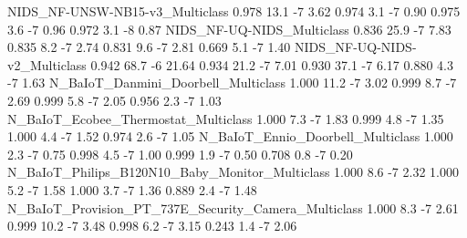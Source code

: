 NIDS_NF-UNSW-NB15-v3_Multiclass                                       0.978               13.1           -7            3.62      0.974                   3.1              -7               0.90      0.975                   3.6              -7               0.96       0.972                    3.1               -8                0.87
NIDS_NF-UQ-NIDS_Multiclass                                            0.836               25.9           -7            7.83      0.835                   8.2              -7               2.74      0.831                   9.6              -7               2.81       0.669                    5.1               -7                1.40
NIDS_NF-UQ-NIDS-v2_Multiclass                                         0.942               68.7           -6           21.64      0.934                  21.2              -7               7.01      0.930                  37.1              -7               6.17       0.880                    4.3               -7                1.63
N_BaIoT_Danmini_Doorbell_Multiclass                                   1.000               11.2           -7            3.02      0.999                   8.7              -7               2.69      0.999                   5.8              -7               2.05       0.956                    2.3               -7                1.03
N_BaIoT_Ecobee_Thermostat_Multiclass                                  1.000                7.3           -7            1.83      0.999                   4.8              -7               1.35      1.000                   4.4              -7               1.52       0.974                    2.6               -7                1.05
N_BaIoT_Ennio_Doorbell_Multiclass                                     1.000                2.3           -7            0.75      0.998                   4.5              -7               1.00      0.999                   1.9              -7               0.50       0.708                    0.8               -7                0.20
N_BaIoT_Philips_B120N10_Baby_Monitor_Multiclass                       1.000                8.6           -7            2.32      1.000                   5.2              -7               1.58      1.000                   3.7              -7               1.36       0.889                    2.4               -7                1.48
N_BaIoT_Provision_PT_737E_Security_Camera_Multiclass                  1.000                8.3           -7            2.61      0.999                  10.2              -7               3.48      0.998                   6.2              -7               3.15       0.243                    1.4               -7                2.06
